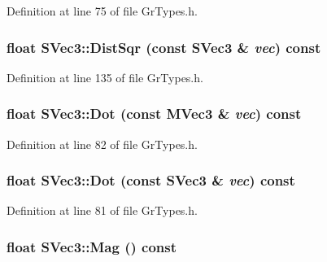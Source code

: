 Definition at line 75 of file GrTypes.h.\hypertarget{struct_s_vec3_222b0f4cd0f52471ebf70dbad68dd03b}{
\subsubsection[{DistSqr}]{\setlength{\rightskip}{0pt plus 5cm}float SVec3::DistSqr (const {\bf SVec3} \& {\em vec}) const}}
\label{struct_s_vec3_222b0f4cd0f52471ebf70dbad68dd03b}




Definition at line 135 of file GrTypes.h.\hypertarget{struct_s_vec3_f3e9779336e5a54ecbdd254e0de35511}{
\subsubsection[{Dot}]{\setlength{\rightskip}{0pt plus 5cm}float SVec3::Dot (const {\bf MVec3} \& {\em vec}) const}}
\label{struct_s_vec3_f3e9779336e5a54ecbdd254e0de35511}




Definition at line 82 of file GrTypes.h.\hypertarget{struct_s_vec3_4f0aa544f63c27bde9e89363ca58c6a6}{
\subsubsection[{Dot}]{\setlength{\rightskip}{0pt plus 5cm}float SVec3::Dot (const {\bf SVec3} \& {\em vec}) const}}
\label{struct_s_vec3_4f0aa544f63c27bde9e89363ca58c6a6}




Definition at line 81 of file GrTypes.h.\hypertarget{struct_s_vec3_903103913dbda8f416cd4eaab7faa5f7}{
\subsubsection[{Mag}]{\setlength{\rightskip}{0pt plus 5cm}float SVec3::Mag () const}}
\label{struct_s_vec3_903103913dbda8f416cd4eaab7faa5f7}




